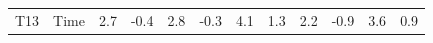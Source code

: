 \documentclass[12pt]{article}
\begin{document}
\begin{table}[!h]
\begin{tabular}{llllllllllll}
T13         & \textcolor[rgb]{0.067,0.067,0.067}{Time}                                                                                            & 2.7                                                                   & -0.4                                                                 & 2.8                                                                   & -0.3                                                                 & 4.1                                                                              & 1.3                                                                  & 2.2                                                                   & -0.9                                                                 & 3.6                                                                   & 0.9
\end{tabular}
\hline
\label{tab:average_rating_sentiment_1}
\end{table}
\end{document}
